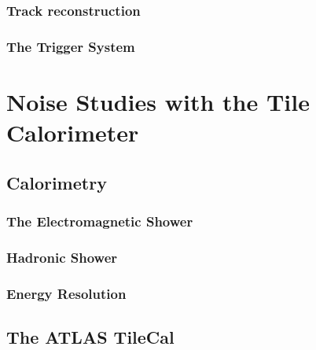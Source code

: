 \documentclass[10pt,twoside,cucitura,classica,english,openany]{toptesi}
\begin{document}


\subsection{Track reconstruction}
\label{sec:track-reconstruction}



\subsection{The Trigger System}
\label{sec:trigger-system}



\chapter{Noise Studies with the Tile Calorimeter}
\label{cha:noise-studies-with}

\section{Calorimetry}
\label{sec:calorimetry}



\subsection{The Electromagnetic Shower}
\label{sec:electr-show}



\subsection{Hadronic Shower}
\label{sec:hadronic-shower}



\subsection{Energy Resolution}
\label{sec:energy-resolution}



\section{The ATLAS TileCal}
\label{sec:atlas-tilecal}
\end{document}

